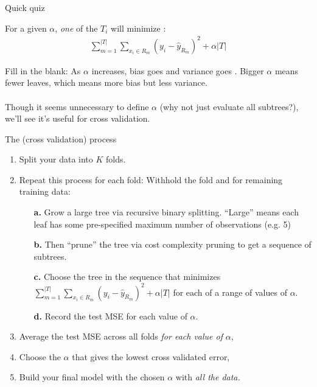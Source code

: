 \documentclass[mathserif, aspectratio=169]{beamer}
\begin{document}
\begin{frame}{Quick quiz}

For a given $\alpha$, \textit{one} of the $T_i$ will minimize :
\begin{align*}
\sum_{m=1}^{|T|} \sum_{x_i\in R_m} (y_i-\hat{y}_{R_m})^2+\alpha|T|
\end{align*}

Fill in the blank:  As $\alpha$ increases, bias goes \underline{} and variance goes \underline{}.  
%
\pause
%
Bigger $\alpha$ means fewer leaves, which means more bias but less variance.   \\~\\

Though it seems unnecessary to define $\alpha$ (why not just evaluate all subtrees?), we'll see it's useful for cross validation.  
\end{frame}

\begin{frame}{The (cross validation) process}

\begin{enumerate}
\item Split your data into $K$ folds.  
\vspace{3mm}
\item Repeat this process for each fold: Withhold the fold and for remaining training data:
\begin{enumerate}
\item[\textbf{a.}] Grow a large tree via recursive binary splitting.  ``Large'' means each leaf has some pre-specified maximum number of observations (e.g. 5)
\item[\textbf{b.}] Then ``prune'' the tree via cost complexity pruning to get a sequence of subtrees.  
\item[\textbf{c.}] Choose the tree in the sequence that minimizes $\sum_{m=1}^{|T|} \sum_{x_i\in R_m} (y_i-\hat{y}_{R_m})^2+\alpha|T|$ for each of a range of values of $\alpha$.
\item[\textbf{d.}] Record the test MSE for each value of $\alpha$.
\vspace{3mm}
\end{enumerate}
\item Average the test MSE across all folds \textit{for each value of }$\alpha$, 
\vspace{3mm}
\item Choose the $\alpha$ that gives the lowest cross validated error, 
\vspace{3mm}
\item Build your final model with the chosen $\alpha$ with \textit{all the data.}
\end{enumerate}
\end{frame}
\end{document}
